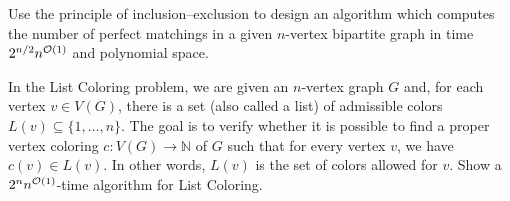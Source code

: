 \documentclass[english]{uebung_cs}
\begin{document}
\begin{exercise}
  Use the principle of inclusion--exclusion to design an algorithm which computes the number of perfect matchings in a given \(n\)-vertex bipartite graph in time \(2^{n/2} n^{\mathcal{O}(1)}\) and polynomial space.
\end{exercise}

\begin{exercise} %
  In the List Coloring problem, we are given an $n$-vertex graph \( G \) and, for each vertex \( v \in V(G) \), there is a set (also called a list) of admissible colors \( L(v) \subseteq \{1,\dots,n\} \). The goal is to verify whether it is possible to find a proper vertex coloring \( c \colon V(G) \rightarrow \mathbb{N} \) of \( G \) such that for every vertex \( v \), we have \( c(v) \in L(v) \). In other words, \( L(v) \) is the set of colors allowed for \( v \).
  Show a \( 2^n n^{\mathcal{O}(1)} \)-time algorithm for List Coloring.
\end{exercise}
\end{document}

